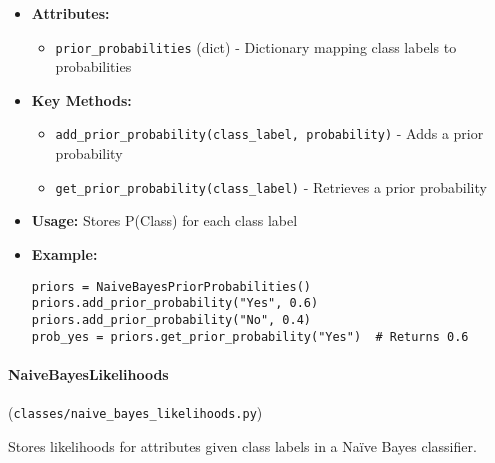 \documentclass[
english,
smallborders
]{i6prcsht}
\begin{document}
\begin{itemize}
	\item \textbf{Attributes:}
	      \begin{itemize}
		      \item \texttt{prior\_probabilities} (dict) - Dictionary mapping class labels to probabilities
	      \end{itemize}
	\item \textbf{Key Methods:}
	      \begin{itemize}
		      \item \texttt{add\_prior\_probability(class\_label, probability)} - Adds a prior probability
		      \item \texttt{get\_prior\_probability(class\_label)} - Retrieves a prior probability
	      \end{itemize}
	\item \textbf{Usage:} Stores P(Class) for each class label
	\item \textbf{Example:}
	      \begin{lstlisting}
priors = NaiveBayesPriorProbabilities()
priors.add_prior_probability("Yes", 0.6)
priors.add_prior_probability("No", 0.4)
prob_yes = priors.get_prior_probability("Yes")  # Returns 0.6
    \end{lstlisting}
\end{itemize}

\vspace*{0.3cm}

\paragraph{NaiveBayesLikelihoods} (\texttt{classes/naive\_bayes\_likelihoods.py})

Stores likelihoods for attributes given class labels in a Naïve Bayes classifier.
\end{document}
